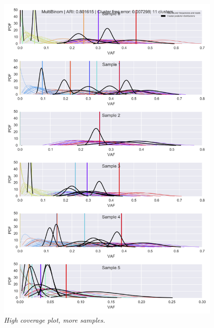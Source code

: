 \documentclass[11pt]{article}
\begin{document}
\begin{appendices}
\begin{figure}[H]
\centerline{\includegraphics[scale=0.725]{low_coverage_high_samples_plot.png}}
\caption{\emph{High coverage plot, more samples.}}
\vspace{-0.45in}
\end{figure}


\end{appendices}
\end{document}
